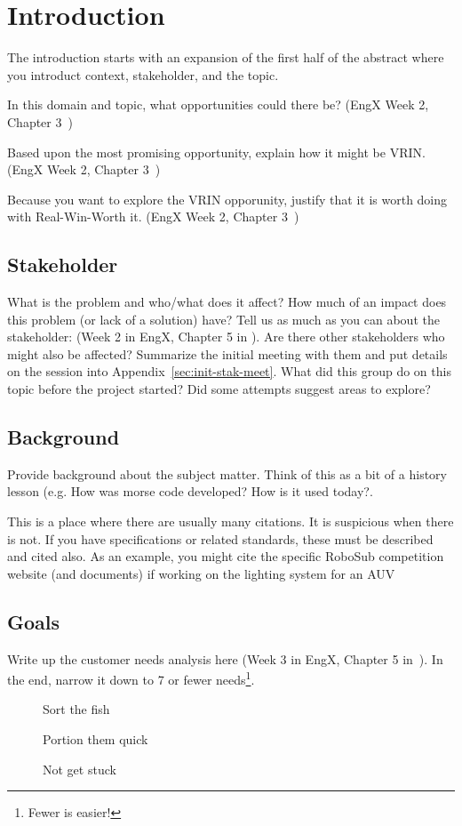 \chapter{Introduction\label{cha:introduction}}
The introduction starts with an expansion of the first half of the abstract where you introduct context, stakeholder, and the topic.

In this domain and topic, what opportunities could there be?  (EngX Week 2, Chapter 3~\cite{ulrich2020product-design-development})

Based upon the most promising opportunity, explain how it might be VRIN. (EngX Week 2, Chapter 3~\cite{ulrich2020product-design-development})

Because you want to explore the VRIN opporunity, justify that it is worth doing with Real-Win-Worth it. (EngX Week 2, Chapter 3~\cite{ulrich2020product-design-development})

\section{Stakeholder}
What is the problem and who/what does it affect?
How much of an impact does this problem (or lack of a solution) have?
Tell us as much as you can about the stakeholder: (Week 2 in EngX, Chapter 5 in \cite{ulrich2020product-design-development}).
Are there other stakeholders who might also be affected?
Summarize the initial meeting with them and put details on the session into Appendix~\ref{sec:init-stak-meet}.
What did this group do on this topic before the project started?
Did some attempts suggest areas to explore?
\section{Background}
Provide background about the subject matter.
Think of this as a bit of a history lesson (e.g. How was morse code
developed?  How is it used today?.

This is a place where there are usually many citations.
It is suspicious when there is not.
If you have specifications or related standards, these must be
described and cited also.
As an example, you might cite the specific
RoboSub competition website (and documents) if working on the lighting system for an AUV\cite{guls2016auvlight}

\section{Goals}
Write up the customer needs analysis here (Week 3 in EngX, Chapter 5 in~\cite{ulrich2020product-design-development}).
In the end, narrow it down to 7 or fewer needs\footnote{Fewer is easier!}. 
\begin{description}
  \item[]  Sort the fish
  \item[]
    Portion them quick
  \item[]  Not get stuck
\end{description}

